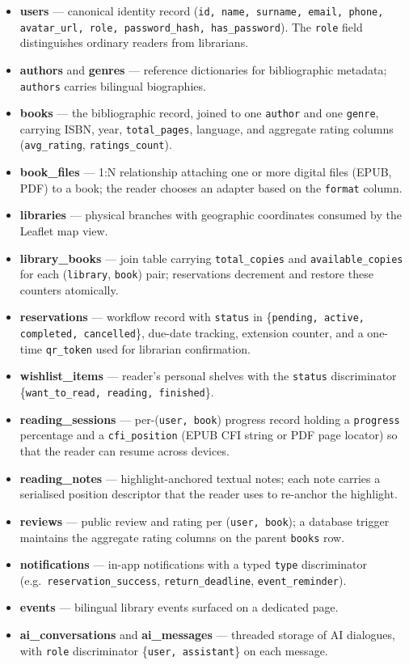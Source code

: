 \documentclass[12pt,a4paper]{report}
\begin{document}
\begin{itemize}[leftmargin=*]
    \item \textbf{users} --- canonical identity record (\texttt{id, name,
    surname, email, phone, avatar\_url, role, password\_hash,
    has\_password}). The \texttt{role} field distinguishes ordinary
    readers from librarians.
    \item \textbf{authors} and \textbf{genres} --- reference dictionaries
    for bibliographic metadata; \texttt{authors} carries bilingual
    biographies.
    \item \textbf{books} --- the bibliographic record, joined to one
    \texttt{author} and one \texttt{genre}, carrying ISBN, year,
    \texttt{total\_pages}, language, and aggregate rating columns
    (\texttt{avg\_rating}, \texttt{ratings\_count}).
    \item \textbf{book\_files} --- 1:N relationship attaching one or more
    digital files (EPUB, PDF) to a book; the reader chooses an adapter
    based on the \texttt{format} column.
    \item \textbf{libraries} --- physical branches with geographic
    coordinates consumed by the Leaflet map view.
    \item \textbf{library\_books} --- join table carrying
    \texttt{total\_copies} and \texttt{available\_copies} for each
    (\texttt{library}, \texttt{book}) pair; reservations decrement and
    restore these counters atomically.
    \item \textbf{reservations} --- workflow record with \texttt{status}
    in \{\texttt{pending, active, completed, cancelled}\}, due-date
    tracking, extension counter, and a one-time \texttt{qr\_token} used
    for librarian confirmation.
    \item \textbf{wishlist\_items} --- reader's personal shelves with the
    \texttt{status} discriminator \{\texttt{want\_to\_read, reading,
    finished}\}.
    \item \textbf{reading\_sessions} --- per-(\texttt{user, book})
    progress record holding a \texttt{progress} percentage and a
    \texttt{cfi\_position} (EPUB CFI string or PDF page locator) so that
    the reader can resume across devices.
    \item \textbf{reading\_notes} --- highlight-anchored textual notes;
    each note carries a serialised position descriptor that the reader
    uses to re-anchor the highlight.
    \item \textbf{reviews} --- public review and rating per (\texttt{user,
    book}); a database trigger maintains the aggregate rating columns on
    the parent \texttt{books} row.
    \item \textbf{notifications} --- in-app notifications with a typed
    \texttt{type} discriminator (e.g.\ \texttt{reservation\_success},
    \texttt{return\_deadline}, \texttt{event\_reminder}).
    \item \textbf{events} --- bilingual library events surfaced on a
    dedicated page.
    \item \textbf{ai\_conversations} and \textbf{ai\_messages} ---
    threaded storage of AI dialogues, with \texttt{role} discriminator
    \{\texttt{user, assistant}\} on each message.
\end{itemize}
\end{document}

